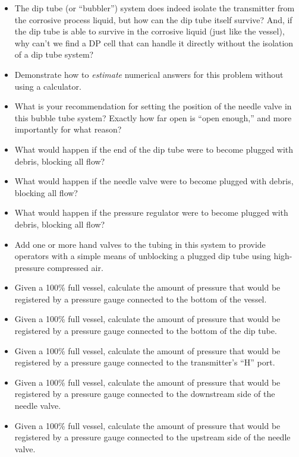 \begin{itemize}
\item{} The dip tube (or ``bubbler'') system does indeed isolate the transmitter from the corrosive process liquid, but how can the dip tube itself survive?  And, if the dip tube is able to survive in the corrosive liquid (just like the vessel), why can't we find a DP cell that can handle it directly without the isolation of a dip tube system?
\item{} Demonstrate how to {\it estimate} numerical answers for this problem without using a calculator.
\item{} What is your recommendation for setting the position of the needle valve in this bubble tube system?  Exactly how far open is ``open enough,'' and more importantly for what reason?
\item{} What would happen if the end of the dip tube were to become plugged with debris, blocking all flow?
\item{} What would happen if the needle valve were to become plugged with debris, blocking all flow?
\item{} What would happen if the pressure regulator were to become plugged with debris, blocking all flow?
\item{} Add one or more hand valves to the tubing in this system to provide operators with a simple means of unblocking a plugged dip tube using high-pressure compressed air.
\item{} Given a 100\% full vessel, calculate the amount of pressure that would be registered by a pressure gauge connected to the bottom of the vessel.
\item{} Given a 100\% full vessel, calculate the amount of pressure that would be registered by a pressure gauge connected to the bottom of the dip tube.
\item{} Given a 100\% full vessel, calculate the amount of pressure that would be registered by a pressure gauge connected to the transmitter's ``H'' port.
\item{} Given a 100\% full vessel, calculate the amount of pressure that would be registered by a pressure gauge connected to the downstream side of the needle valve.
\item{} Given a 100\% full vessel, calculate the amount of pressure that would be registered by a pressure gauge connected to the upstream side of the needle valve.
\end{itemize}






